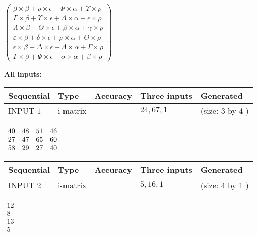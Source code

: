 \documentclass[12pt]{article}
\begin{document}
   
 $   \left( \begin{array}
 {
 c
 }
 \beta \times  \beta   +  \rho \times  \epsilon   +  \Psi \times  \alpha   +  \Upsilon \times  \rho \\ 
 \Gamma \times  \beta   +  \Upsilon \times  \epsilon   +  \Lambda \times  \alpha   +  \epsilon \times  \rho \\ 
 \Lambda \times  \beta   +  \Theta \times  \epsilon   +  \beta \times  \alpha   +  \gamma \times  \rho \\ 
 \varepsilon \times  \beta   +  \delta \times  \epsilon   +  \rho \times  \alpha   +  \Theta \times  \rho \\ 
 \epsilon \times  \beta   +  \Delta \times  \epsilon   +  \Lambda \times  \alpha   +  \Gamma \times  \rho \\ 
 \Gamma \times  \beta   +  \Psi \times  \epsilon   +  \sigma \times  \alpha   +  \beta \times  \rho
 \end{array} \right) $ 
   
   
\noindent\vspace{0.1in}\hspace{-0.08in} {\textbf{\Large{All inputs: }}}
   
   
  
  
\noindent\begin{tabular}{|l|l|l|l|l|}
\hline
 Sequential & Type & Accuracy & Three inputs & Generated \\ 
\hline
 
 
  INPUT $  1 $ & i-matrix &  & $
 24
 , 
 67
 , 
 1
 $ & (size:  3  by  4 )
 \\  \hline  
 \end{tabular}
   
   
 $\begin{array}{
 c
 c
 c
 c
 }
 40  & 
 48  & 
 51  & 
 46  \\ 
 27  & 
 47  & 
 65  & 
 60  \\ 
 58  & 
 29  & 
 27  & 
 40
\end{array}  $ 
  
  
\noindent\begin{tabular}{|l|l|l|l|l|}
\hline
 Sequential & Type & Accuracy & Three inputs & Generated \\ 
\hline
 
 
  INPUT $  2 $ & i-matrix &  & $
 5
 , 
 16
 , 
 1
 $ & (size:  4  by  1 )
 \\  \hline  
 \end{tabular}
   
   
 $\begin{array}{
 c
 }
 12  \\ 
 8  \\ 
 13  \\ 
 5
\end{array}  $ 
  
\end{document}
